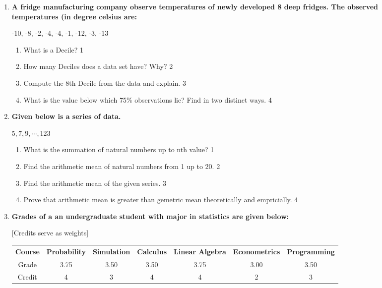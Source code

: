 \documentclass[a4paper,oneside]{book}
\begin{document}
\begin{enumerate}
   \item
	  \textbf{A fridge manufacturing company observe temperatures of newly developed 8 deep fridges. The observed temperatures (in degree celsius are:} 
	  
	    \begin{center}
-10, -8, -2, -4, -4, -1, -12, -3, -13
  \end{center}
  
  \begin{enumerate}
    \item
	What is a Decile? \hfill 1
    \item
	How many Deciles does a data set have? Why? \hfill 2
    \item  
	Compute the 8th Decile from the data and explain. \hfill 3
    \item
	What is the value below which 75\% observations lie? Find in two distinct ways. \hfill 4
  \end{enumerate}
  
   \item
	  \textbf{Given below is a series of data.} 
	  
	  	    \begin{center}
	 $5, 7, 9, \cdots , 123$
	    \end{center}
  
  \begin{enumerate}
    \item
	What is the summation of natural numbers up to nth value? \hfill 1
    \item
	Find the arithmetic mean of natural numbers from 1 up to 20. \hfill 2
    \item  
	Find the arithmetic mean of the given series. \hfill 3
    \item
	Prove that arithmetic mean is greater than gemetric mean theoretically and empricially. \hfill 4
  \end{enumerate}
  
   \item
	  \textbf{Grades of a an undergraduate student with major in statistics are given below: } 
	  
	  [Credits serve as weights]

\begin{table}[h]
\centering
\begin{tabular}{c|c|c|c|c|c|c}
\hline
Course & Probability & Simulation & Calculus & Linear Algebra & Econometrics & Programming \\ \hline
Grade & 3.75 & 3.50 & 3.50 & 3.75 & 3.00 & 3.50 \\  \hline
Credit & 4 & 3 & 4 & 4 & 2 & 3 \\ \hline
\end{tabular}
\end{table}



\end{enumerate}
\end{document}
